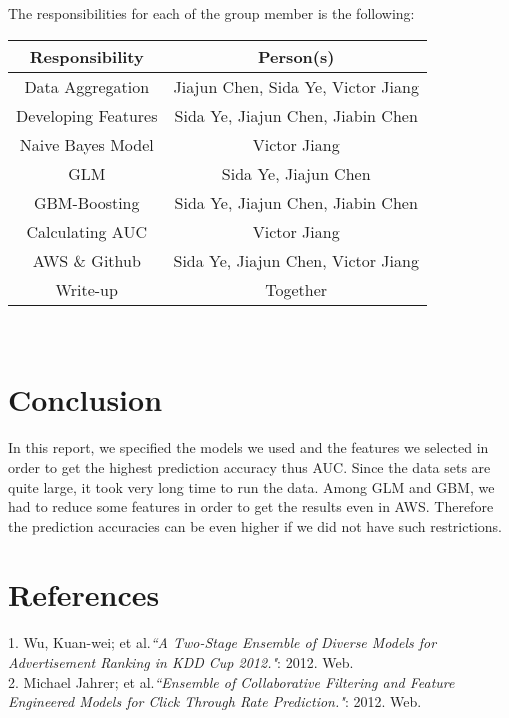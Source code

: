 \documentclass[12pt]{article}
\begin{document}
The responsibilities  for each of the group member is the following:

\begin{table}[h]\centering
\large
\begin{tabular}{| c | c |}
\hline
Responsibility & Person(s)\\
\hline
Data Aggregation & Jiajun Chen, Sida Ye, Victor Jiang\\
\hline
Developing Features & Sida Ye, Jiajun Chen, Jiabin Chen\\
\hline
Naive Bayes Model & Victor Jiang\\
\hline
GLM & Sida Ye, Jiajun Chen\\
\hline
GBM-Boosting & Sida Ye, Jiajun Chen, Jiabin Chen\\
\hline
Calculating AUC & Victor Jiang\\
\hline
AWS \& Github & Sida Ye, Jiajun Chen, Victor Jiang\\
\hline
Write-up& Together\\
\hline
\end{tabular}\\
\end{table}



\section{Conclusion}
In this report, we specified the models we used and the features we selected in order to get the highest prediction accuracy thus AUC. Since the data sets are quite large, it took very long time to run the data. Among GLM and GBM, we had to reduce some features in order to get the results even in AWS. Therefore the prediction accuracies can be even higher if we did not have such restrictions. 


\section{References}
1. Wu, Kuan-wei; et al.\emph{``A Two-Stage Ensemble of Diverse Models for Advertisement Ranking in KDD Cup 2012."}:  2012. Web.\\
2. Michael Jahrer; et al.\emph{``Ensemble of Collaborative Filtering and Feature Engineered Models for Click Through Rate Prediction."}:  2012. Web.\\
\end{document}
